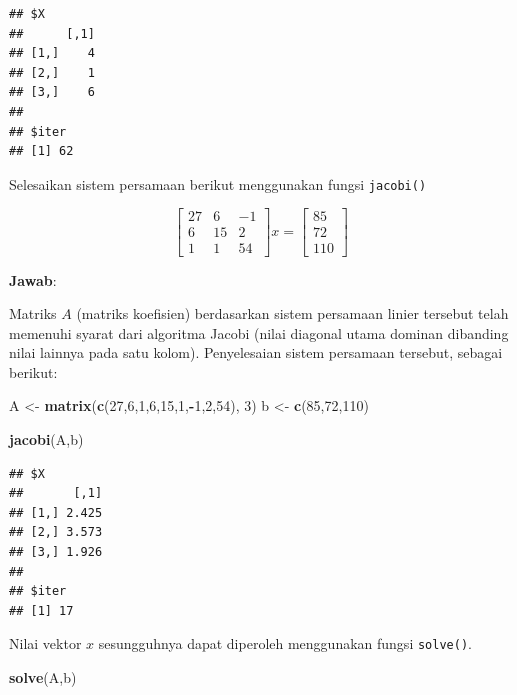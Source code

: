 \documentclass[]{book}
\newenvironment{Shaded}{\begin{snugshade}}{\end{snugshade}}
\newcommand{\DecValTok}[1]{\textcolor[rgb]{0.00,0.00,0.81}{#1}}
\newcommand{\KeywordTok}[1]{\textcolor[rgb]{0.13,0.29,0.53}{\textbf{#1}}}
\newcommand{\NormalTok}[1]{#1}
\newcommand{\OperatorTok}[1]{\textcolor[rgb]{0.81,0.36,0.00}{\textbf{#1}}}
\newcommand{\StringTok}[1]{\textcolor[rgb]{0.31,0.60,0.02}{#1}}
\theoremstyle{definition}
\theoremstyle{definition}
\theoremstyle{definition}
\theoremstyle{remark}
\let\BeginKnitrBlock\begin \let\EndKnitrBlock\end
\begin{document}
\begin{verbatim}
## $X
##      [,1]
## [1,]    4
## [2,]    1
## [3,]    6
## 
## $iter
## [1] 62
\end{verbatim}

\BeginKnitrBlock{example}
\protect\hypertarget{exm:jacobiexm2}{}{\label{exm:jacobiexm2} }Selesaikan sistem persamaan berikut menggunakan fungsi \texttt{jacobi()}
\EndKnitrBlock{example}

\[
\begin{bmatrix}
     27 & 6 & -1     \\[0.3em]
     6 & 15 & 2     \\[0.3em]
     1 & 1 & 54
\end{bmatrix}
x = \begin{bmatrix}
     85     \\[0.3em]
     72     \\[0.3em]
     110
\end{bmatrix}
\]

\textbf{Jawab}:

Matriks \(A\) (matriks koefisien) berdasarkan sistem persamaan linier tersebut telah memenuhi syarat dari algoritma Jacobi (nilai diagonal utama dominan dibanding nilai lainnya pada satu kolom). Penyelesaian sistem persamaan tersebut, sebagai berikut:

\begin{Shaded}
\begin{Highlighting}[]
\NormalTok{A <-}\StringTok{ }\KeywordTok{matrix}\NormalTok{(}\KeywordTok{c}\NormalTok{(}\DecValTok{27}\NormalTok{,}\DecValTok{6}\NormalTok{,}\DecValTok{1}\NormalTok{,}\DecValTok{6}\NormalTok{,}\DecValTok{15}\NormalTok{,}\DecValTok{1}\NormalTok{,}\OperatorTok{-}\DecValTok{1}\NormalTok{,}\DecValTok{2}\NormalTok{,}\DecValTok{54}\NormalTok{), }\DecValTok{3}\NormalTok{)}
\NormalTok{b <-}\StringTok{ }\KeywordTok{c}\NormalTok{(}\DecValTok{85}\NormalTok{,}\DecValTok{72}\NormalTok{,}\DecValTok{110}\NormalTok{)}

\KeywordTok{jacobi}\NormalTok{(A,b)}
\end{Highlighting}
\end{Shaded}

\begin{verbatim}
## $X
##       [,1]
## [1,] 2.425
## [2,] 3.573
## [3,] 1.926
## 
## $iter
## [1] 17
\end{verbatim}

Nilai vektor \(x\) sesungguhnya dapat diperoleh menggunakan fungsi \texttt{solve()}.

\begin{Shaded}
\begin{Highlighting}[]
\KeywordTok{solve}\NormalTok{(A,b)}
\end{Highlighting}
\end{Shaded}
\end{document}
